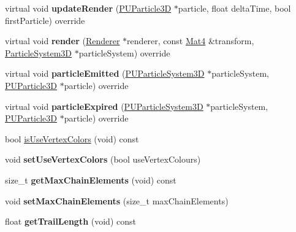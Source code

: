 \begin{DoxyCompactItemize}
virtual void {\bfseries update\+Render} (\hyperlink{structPUParticle3D}{P\+U\+Particle3D} $\ast$particle, float delta\+Time, bool first\+Particle) override
\item 
\mbox{\label{classPURibbonTrailRender_af2e23db820575b2ca846ecfe4fec21d0}} 
virtual void {\bfseries render} (\hyperlink{classRenderer}{Renderer} $\ast$renderer, const \hyperlink{classMat4}{Mat4} \&transform, \hyperlink{classParticleSystem3D}{Particle\+System3D} $\ast$particle\+System) override
\item 
\mbox{\label{classPURibbonTrailRender_ade01e7b05dc309fcc3c9d3ccff7c3aaf}} 
virtual void {\bfseries particle\+Emitted} (\hyperlink{classPUParticleSystem3D}{P\+U\+Particle\+System3D} $\ast$particle\+System, \hyperlink{structPUParticle3D}{P\+U\+Particle3D} $\ast$particle) override
\item 
\mbox{\label{classPURibbonTrailRender_a23af4c520ce49441f92f156588188262}} 
virtual void {\bfseries particle\+Expired} (\hyperlink{classPUParticleSystem3D}{P\+U\+Particle\+System3D} $\ast$particle\+System, \hyperlink{structPUParticle3D}{P\+U\+Particle3D} $\ast$particle) override
\item 
bool \hyperlink{classPURibbonTrailRender_abab685908ebf8ffa5a42689415647fe8}{is\+Use\+Vertex\+Colors} (void) const
\item 
\mbox{\label{classPURibbonTrailRender_a657f9b7a4fc70398511f1b4c250a70dc}} 
void {\bfseries set\+Use\+Vertex\+Colors} (bool use\+Vertex\+Colours)
\item 
\mbox{\label{classPURibbonTrailRender_a07e286610f4360490a2af27d06f64607}} 
size\+\_\+t {\bfseries get\+Max\+Chain\+Elements} (void) const
\item 
\mbox{\label{classPURibbonTrailRender_a456d124c1984a53bc4c59238b0533745}} 
void {\bfseries set\+Max\+Chain\+Elements} (size\+\_\+t max\+Chain\+Elements)
\item 
\mbox{\label{classPURibbonTrailRender_ab643669b44caf3cc79024f79113b350e}} 
float {\bfseries get\+Trail\+Length} (void) const
\item 

\end{DoxyCompactItemize}
